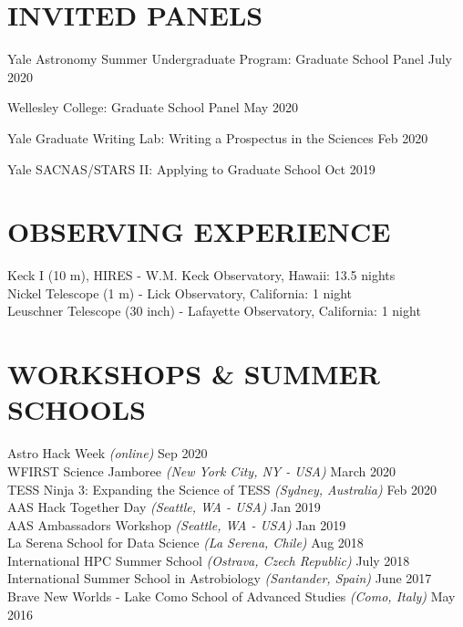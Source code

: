 \documentclass[margin]{res}
\begin{document}
\begin{resume}
\section{\normalfont INVITED PANELS}

Yale Astronomy Summer Undergraduate Program: Graduate School Panel \hfill July 2020\\
\vspace{-8mm}

Wellesley College: Graduate School Panel \hfill May 2020\\
\vspace{-8mm}

Yale Graduate Writing Lab: Writing a Prospectus in the Sciences \hfill Feb 2020\\
\vspace{-8mm}

Yale SACNAS/STARS II: Applying to Graduate School \hfill Oct 2019


\section{\normalfont OBSERVING EXPERIENCE}

\textbullet{} Keck I (10 m), HIRES - W.M. Keck Observatory, Hawaii: 13.5 nights \\
\textbullet{} Nickel Telescope (1 m) - Lick Observatory, California: 1 night \\
\textbullet{} Leuschner Telescope (30 inch) - Lafayette Observatory, California: 1 night


\section{\normalfont WORKSHOPS \& SUMMER SCHOOLS}
Astro Hack Week \textit{(online)} \hfill Sep 2020 \\
WFIRST Science Jamboree \textit{(New York City, NY - USA)} \hfill March 2020 \\
TESS Ninja 3: Expanding the Science of TESS \textit{(Sydney, Australia)} \hfill Feb 2020 \\
AAS Hack Together Day \textit{(Seattle, WA - USA)} \hfill Jan 2019 \\
AAS Ambassadors Workshop \textit{(Seattle, WA - USA)} \hfill Jan 2019 \\
La Serena School for Data Science \textit{(La Serena, Chile)} \hfill Aug 2018 \\
International HPC Summer School \textit{(Ostrava, Czech Republic)} \hfill July 2018 \\
International Summer School in Astrobiology \textit{(Santander, Spain)} \hfill June 2017 \\
Brave New Worlds - Lake Como School of Advanced Studies \textit{(Como, Italy)} \hfill May 2016


\end{resume}
\end{document}
